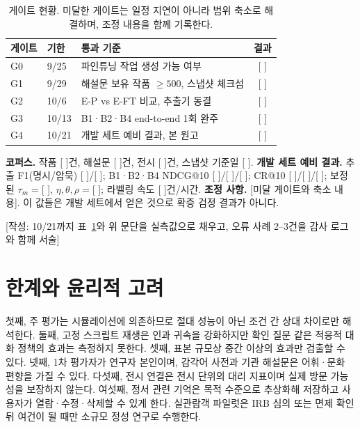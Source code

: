 \documentclass[10pt,twocolumn,letterpaper]{article}
\newcommand{\fillin}[1]{\textcolor{fillc}{[#1]}}
\newcommand{\todo}[1]{{\sffamily\footnotesize\textcolor{todoc}{[작성: #1]}}}
\begin{document}
\begin{table}[t]
\centering\small
\setlength{\tabcolsep}{3.5pt}
\begin{tabularx}{\columnwidth}{@{}l l >{\raggedright\arraybackslash}X c@{}}
\toprule
게이트 & 기한 & 통과 기준 & 결과 \\
\midrule
G0 & 9/25 & 파인튜닝 작업 생성 가능 여부 & \fillin{ } \\
G1 & 9/29 & 해설문 보유 작품 $\ge500$, 스냅샷 체크섬 & \fillin{ } \\
G2 & 10/6 & E-P vs E-FT 비교, 추출기 동결 & \fillin{ } \\
G3 & 10/13 & B1·B2·B4 end-to-end 1회 완주 & \fillin{ } \\
G4 & 10/21 & 개발 세트 예비 결과, 본 원고 & \fillin{ } \\
\bottomrule
\end{tabularx}
\caption{게이트 현황. 미달한 게이트는 일정 지연이 아니라 범위 축소로 해결하며, 조정 내용을 함께 기록한다.}
\label{tab:gates}
\end{table}

\textbf{코퍼스.} 작품 \fillin{ }건, 해설문 \fillin{ }건, 전시 \fillin{ }건, 스냅샷 기준일 \fillin{ }.
\textbf{개발 세트 예비 결과.} 추출 F1(명시/암묵) \fillin{ }/\fillin{ }; B1·B2·B4 NDCG@10 \fillin{ }/\fillin{ }/\fillin{ }; CR@10 \fillin{ }/\fillin{ }/\fillin{ }; 보정된 $\tau_m=$\fillin{ }, $\eta,\theta,\rho=$\fillin{ }; 라벨링 속도 \fillin{ }건/시간.
\textbf{조정 사항.} \fillin{미달 게이트와 축소 내용}.
이 값들은 개발 세트에서 얻은 것으로 확증 검정 결과가 아니다.

\todo{10/21까지 표~\ref{tab:gates}와 위 문단을 실측값으로 채우고, 오류 사례 2–3건을 감사 로그와 함께 서술}

\section{한계와 윤리적 고려}
첫째, 주 평가는 시뮬레이션에 의존하므로 절대 성능이 아닌 조건 간 상대 차이로만 해석한다. 둘째, 고정 스크립트 재생은 인과 귀속을 강화하지만 확인 질문 같은 적응적 대화 정책의 효과는 측정하지 못한다. 셋째, 표본 규모상 중간 이상의 효과만 검출할 수 있다. 넷째, 1차 평가자가 연구자 본인이며, 감각어 사전과 기관 해설문은 어휘·문화 편향을 가질 수 있다. 다섯째, 전시 연결은 전시 단위의 대리 지표이며 실제 방문 가능성을 보장하지 않는다. 여섯째, 정서 관련 기억은 목적 수준으로 추상화해 저장하고 사용자가 열람·수정·삭제할 수 있게 한다. 실관람객 파일럿은 IRB 심의 또는 면제 확인 뒤 여건이 될 때만 소규모 정성 연구로 수행한다.
\end{document}
